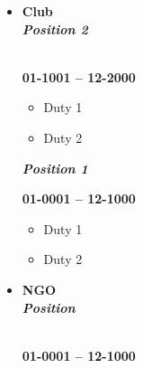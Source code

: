 \noindent\makebox[\linewidth]{\rule{\linewidth}{1.1pt}}
\vspace{-0.5cm}
\begin{itemize} \setlength\itemsep{-0.4em}
	\item \begin{multicols}{2}
		\begin{flushleft}
			\textbf{Club}
			\\
			\textbf{\textit{Position 2}}
		\end{flushleft}
		\columnbreak
		\begin{flushright}
			\hspace*{1em} \\
			\textbf{01-1001 -- 12-2000} 
		\end{flushright}
		
	\end{multicols}
	
	\vspace{-0.3cm}
	\begin{itemize}
		\item Duty 1
		\item Duty 2
	\end{itemize}
	
	\begin{multicols}{2}
		\begin{flushleft}
			\textbf{\textit{Position 1}}
		\end{flushleft}
		\columnbreak
		\begin{flushright}
			\textbf{01-0001 -- 12-1000} 
		\end{flushright}
		
	\end{multicols}
	
	\vspace{-0.3cm}
	\begin{itemize}
		\item Duty 1
		\item Duty 2
	\end{itemize}
	
	\item \begin{multicols}{2}
		\begin{flushleft}
			\textbf{NGO}
			\\
			\textbf{\textit{Position}}
		\end{flushleft}
		\columnbreak
		\begin{flushright}
			\hspace*{1em} \\
			\textbf{01-0001 -- 12-1000} 
		\end{flushright}
	\end{multicols}
	

\end{itemize}
